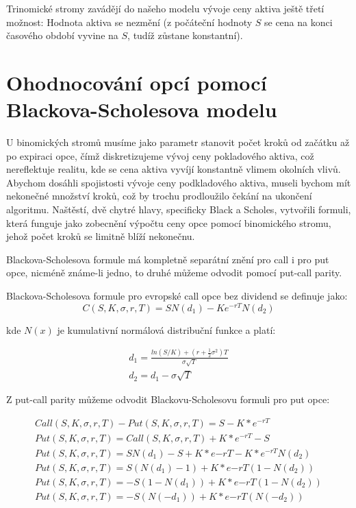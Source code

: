 \documentclass[male,czech,api_bc]{kitheses}
\begin{document}
  Trinomické stromy zavádějí do našeho modelu vývoje ceny aktiva ještě třetí možnost: Hodnota aktiva se nezmění (z počáteční hodnoty $S$ se cena na konci časového období vyvine na $S$, tudíž zůstane konstantní). 

  \section{Ohodnocování opcí pomocí Blackova-Scholesova modelu}

  U binomických stromů musíme jako parametr stanovit počet kroků od začátku až po expiraci opce, čímž diskretizujeme vývoj ceny pokladového aktiva, což nereflektuje realitu, kde se cena aktiva vyvíjí konstantně vlimem okolních vlivů. Abychom dosáhli spojistosti vývoje ceny podkladového aktiva, museli bychom mít nekonečné množství kroků, což by trochu prodloužilo čekání na ukončení algoritmu. Naštěstí, dvě chytré hlavy, specificky Black a Scholes, vytvořili formuli, která funguje jako zobecnění výpočtu ceny opce pomocí binomického stromu, jehož počet kroků se limitně blíží nekonečnu.

  Blackova-Scholesova formule má kompletně separátní znění pro call i pro put opce, nicméně známe-li jedno, to druhé můžeme odvodit pomocí put-call parity.

  Blackova-Scholesova formule pro evropské call opce bez dividend se definuje jako:
  \begin{equation}
    C(S, K, \sigma, r, T) = SN(d_1) - Ke^{-rT}N(d_2)
  \end{equation}

  kde $N(x)$ je kumulativní normálová distribuční funkce a platí:

  \begin{gather}
    \label{d_1 and d_2}
    d_1 = \frac{ln(S/K) + (r + \frac{1}{2}\sigma ^ 2)T}{\sigma \sqrt{T}} \\
    d_2 = d_1 - \sigma \sqrt{T}
  \end{gather}

  Z put-call parity můžeme odvodit Blackovu-Scholesovu formuli pro put opce:

  \begin{gather*}
    Call(S, K, \sigma, r, T) - Put(S, K, \sigma, r, T) = S - K * e^{-rT} \\
    Put(S, K, \sigma, r, T) = Call(S, K, \sigma, r, T) + K * e^{-rT} - S \\
    Put(S, K, \sigma, r, T) = SN(d_1) - S + K * e{-rT} - K * e^{-rT}N(d_2) \\
    Put(S, K, \sigma, r, T) = S(N(d_1) - 1) + K * e{-rT} (1 - N(d_2))  \\
    Put(S, K, \sigma, r, T) = -S(1 - N(d_1)) + K * e{-rT} (1 - N(d_2))  \\
    Put(S, K, \sigma, r, T) = -S(N(-d_1)) + K * e{-rT} (N(-d_2)) \\
  \end{gather*}
\end{document}
